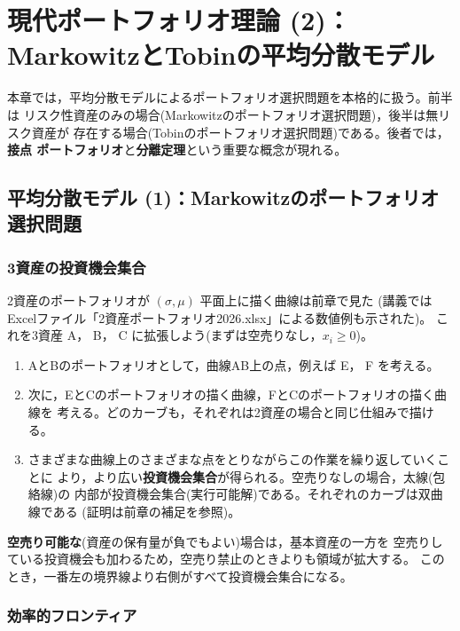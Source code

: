\chapter{現代ポートフォリオ理論 (2)：MarkowitzとTobinの平均分散モデル}

本章では，平均分散モデルによるポートフォリオ選択問題を本格的に扱う。前半は
リスク性資産のみの場合(Markowitzのポートフォリオ選択問題)，後半は無リスク資産が
存在する場合(Tobinのポートフォリオ選択問題)である。後者では，\textbf{接点
ポートフォリオ}と\textbf{分離定理}という重要な概念が現れる。

\section{平均分散モデル (1)：Markowitzのポートフォリオ選択問題}

\subsection{3資産の投資機会集合}

2資産のポートフォリオが $(\sigma,\mu)$ 平面上に描く曲線は前章で見た
(講義では Excelファイル「2資産ポートフォリオ2026.xlsx」による数値例も示された)。
これを3資産 A， B， C に拡張しよう(まずは空売りなし，$x_i\geq 0$)。

\begin{enumerate}
\item AとBのポートフォリオとして，曲線AB上の点，例えば E， F を考える。
\item 次に，EとCのポートフォリオの描く曲線，FとCのポートフォリオの描く曲線を
考える。どのカーブも，それぞれは2資産の場合と同じ仕組みで描ける。
\item さまざまな曲線上のさまざまな点をとりながらこの作業を繰り返していくことに
より，より広い\textbf{投資機会集合}が得られる。空売りなしの場合，太線(包絡線)の
内部が投資機会集合(実行可能解)である。それぞれのカーブは双曲線である
(証明は前章の補足を参照)。
\end{enumerate}

\textbf{空売り可能な}(資産の保有量が負でもよい)場合は，基本資産の一方を
空売りしている投資機会も加わるため，空売り禁止のときよりも領域が拡大する。
このとき，一番左の境界線より右側がすべて投資機会集合になる。

\subsection{効率的フロンティア}

